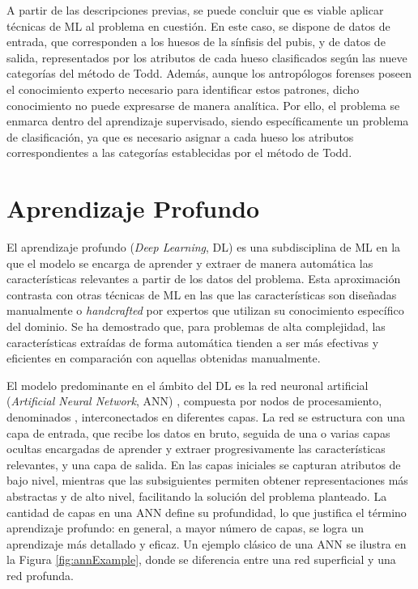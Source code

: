 A partir de las descripciones previas, se puede concluir que es viable aplicar técnicas de ML al problema en cuestión. En este caso, se dispone de datos de entrada, que corresponden a los huesos de la sínfisis del pubis, y de datos de salida, representados por los atributos de cada hueso clasificados según las nueve categorías del método de Todd. Además, aunque los antropólogos forenses poseen el conocimiento experto necesario para identificar estos patrones, dicho conocimiento no puede expresarse de manera analítica. Por ello, el problema se enmarca dentro del aprendizaje supervisado, siendo específicamente un problema de clasificación, ya que es necesario asignar a cada hueso los atributos correspondientes a las categorías establecidas por el método de Todd.

\section{Aprendizaje Profundo}
\label{section2:DL}
El aprendizaje profundo (\textit{Deep Learning}, DL) \cite{Goodfellow-et-al-2016, bishop_deep_2024, prince_understanding_2023, lecun_deep_2015, schmidhuber_deep_2015} es una subdisciplina de ML en la que el modelo se encarga de aprender y extraer de manera automática las características relevantes a partir de los datos del problema. Esta aproximación contrasta con otras técnicas de ML en las que las características son diseñadas manualmente o \textit{handcrafted} por expertos que utilizan su conocimiento específico del dominio. Se ha demostrado que, para problemas de alta complejidad, las características extraídas de forma automática tienden a ser más efectivas y eficientes en comparación con aquellas obtenidas manualmente.

El modelo predominante en el ámbito del DL es la red neuronal artificial (\textit{Artificial Neural Network}, ANN) \cite{bishop_ANN, ripley_ANN}, compuesta por nodos de procesamiento, denominados , interconectados en diferentes capas. La red se estructura con una capa de entrada, que recibe los datos en bruto, seguida de una o varias capas ocultas encargadas de aprender y extraer progresivamente las características relevantes, y una capa de salida. En las capas iniciales se capturan atributos de bajo nivel, mientras que las subsiguientes permiten obtener representaciones más abstractas y de alto nivel, facilitando la solución del problema planteado. La cantidad de capas en una ANN define su profundidad, lo que justifica el término aprendizaje profundo: en general, a mayor número de capas, se logra un aprendizaje más detallado y eficaz. Un ejemplo clásico de una ANN se ilustra en la Figura \ref{fig:annExample}, donde se diferencia entre una red superficial y una red profunda.

